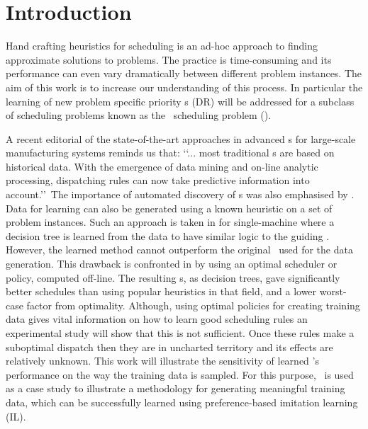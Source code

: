\documentclass[twocolumn]{svjour3}
\begin{document}

\section{Introduction}\label{sec:introduction}

Hand crafting heuristics for scheduling is an ad-hoc approach to finding 
approximate solutions to problems. The practice is time-consuming and its 
performance can even vary dramatically between different problem instances. The 
aim of this work is to increase our understanding of this process. In 
particular the learning of new problem specific priority \dr s (DR) will be 
addressed for a subclass of scheduling problems known as the \jsp\ scheduling 
problem (\JSP). 

A recent editorial of the state-of-the-art approaches \cite{Chen13} in advanced 
\dr s for large-scale manufacturing systems reminds us that:
\lq\lq ... most traditional \dr s are based on historical data. 
With the emergence of data mining and on-line analytic processing, dispatching 
rules can now take predictive information into account.\rq\rq~The importance of 
automated discovery of \dr s was also emphasised by \cite{Monch13}. 
Data for learning can also be generated using a known heuristic on a set of 
problem instances.
Such an approach is taken in \cite{Siggi05} for single-machine where
a decision tree is learned from the data to have similar logic to the guiding 
\dr. 
However, the learned method cannot outperform the original \dr\ used for the 
data 
generation. 
This drawback is confronted in \cite{Malik08,Russell09,Siggi10} by using an 
optimal scheduler or policy, computed off-line. The 
resulting \dr s, as decision trees, gave significantly better schedules than 
using popular heuristics in that field, and a lower worst-case factor from 
optimality. 
Although, using optimal policies for creating training data gives vital 
information on how to learn good scheduling rules an experimental study will 
show that this is not sufficient. 
Once these rules make a suboptimal dispatch then they are in uncharted 
territory and its effects are relatively unknown. 
This work will illustrate the sensitivity of learned \dr's performance on the 
way the training data is sampled.
For this purpose, \JSP\ is used as a case study to illustrate a methodology for 
generating meaningful training data, which can be successfully 
learned using preference-based imitation learning (IL).
\end{document}
